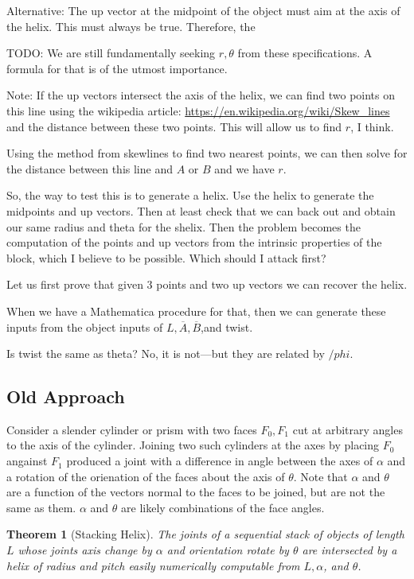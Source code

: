 \documentclass[11pt]{article}
\newtheorem{theorem}{Theorem}
\begin{document}
{Alternative: The up vector at the midpoint of the object must aim at the
axis of the helix. This must always be true. Therefore, the 

TODO: We are still fundamentally seeking $r,\theta$ from these specifications.
A formula for that is of the utmost importance.

Note: If the up vectors intersect the axis of the helix, we can find two
points on this line using the wikipedia article: \url{https://en.wikipedia.org/wiki/Skew_lines}
and the distance between these two points. This will allow us to find $r$, I think.

Using the method from skewlines to find two nearest points, we can then solve for
the distance between this line and $A$ or $B$ and we have $r$.

So, the way to test this is to generate a helix. Use the helix to generate
the midpoints and up vectors. Then at least check that we can back out and
obtain our same radius and theta for the shelix.  Then the problem becomes the
computation of the points and up vectors from the intrinsic properties of the block,
which I believe to be possible.  Which should I attack first?

Let us first prove that given 3 points and two up vectors we can recover the helix.

When we have a Mathematica procedure for that, then we can generate these inputs
from the object inputs of $L,\overline{A},\overline{B}$,and twist.

Is twist the same as theta? No, it is not---but they are related by $/phi$.



\subsection{Old Approach}


Consider a slender cylinder or prism with two faces $F_0,F_1$ cut at arbitrary angles to the axis of the cylinder.
Joining two such cylinders at the axes by placing $F_0$ angainst $F_1$ produced a joint with a difference in
angle between the axes of $\alpha$ and a rotation of the orienation of the faces about the axis of $\theta$.
Note that $\alpha$ and $\theta$ are a function of the vectors normal to the faces to be joined, but are not the same as them. $\alpha$ and $\theta$ are likely combinations of the face angles.

\begin{theorem}[Stacking Helix]
  The joints of a sequential stack of objects of length $L$ whose joints axis change by $\alpha$ and orientation rotate
  by $\theta$ are intersected by a helix of radius and pitch easily numerically computable
  from  $L,\alpha$, and $\theta$.
\end{theorem}

}
\end{document}
